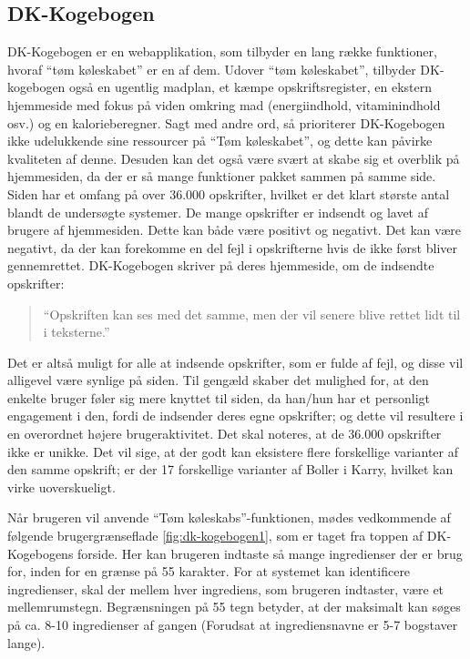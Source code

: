 \subsection{DK-Kogebogen}
\label{subsec:dk-kogebogen}

DK-Kogebogen er en webapplikation, som tilbyder en lang række funktioner, hvoraf ``tøm køleskabet'' er en af dem. Udover ``tøm køleskabet'', tilbyder DK-kogebogen også en ugentlig madplan, et kæmpe opskriftsregister, en ekstern hjemmeside med fokus på viden omkring mad (energiindhold, vitaminindhold osv.) og en kalorieberegner. Sagt med andre ord, så prioriterer DK-Kogebogen ikke udelukkende sine ressourcer på ``Tøm køleskabet'', og dette kan påvirke kvaliteten af denne. Desuden kan det også være svært at skabe sig et overblik på hjemmesiden, da der er så mange funktioner pakket sammen på samme side. Siden har et omfang på over 36.000 opskrifter, hvilket er det klart største antal blandt de undersøgte systemer. De mange opskrifter er indsendt og lavet af brugere af hjemmesiden. Dette kan både være positivt og negativt. Det kan være negativt, da der kan forekomme en del fejl i opskrifterne hvis de ikke først bliver gennemrettet. DK-Kogebogen skriver på deres hjemmeside, om de indsendte opskrifter:

\begin{quote}
``Opskriften kan ses med det samme, men der vil senere blive rettet lidt til i teksterne.'' \cite{dk-kog-indtastopskrift}
\end{quote}

Det er altså muligt for alle at indsende opskrifter, som er fulde af fejl, og disse vil alligevel være synlige på siden. Til gengæld skaber det mulighed for, at den enkelte bruger føler sig mere knyttet til siden, da han/hun har et personligt engagement i den, fordi de indsender deres egne opskrifter; og dette vil resultere i en overordnet højere brugeraktivitet. Det skal noteres, at de 36.000 opskrifter ikke er unikke. Det vil sige, at der godt kan eksistere flere forskellige varianter af den samme opskrift; \fx er der 17 forskellige varianter af Boller i Karry, hvilket kan virke uoverskueligt.

Når brugeren vil anvende ``Tøm køleskabs''-funktionen, mødes vedkommende af følgende brugergrænseflade \ref{fig:dk-kogebogen1}, som er taget fra toppen af DK-Kogebogens forside. Her kan brugeren indtaste så mange ingredienser der er brug for, inden for en grænse på 55 karakter. For at systemet kan identificere ingredienser, skal der mellem hver ingrediens, som brugeren indtaster, være et mellemrumstegn. Begrænsningen på 55 tegn betyder, at der maksimalt kan søges på ca. 8-10 ingredienser af gangen (Forudsat at ingrediensnavne er 5-7 bogstaver lange).

